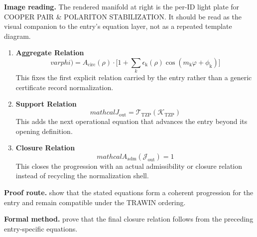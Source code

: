 \begin{samepage}
\noindent\begin{minipage}[t]{0.45\linewidth}
\vspace{0pt}
\raggedright
\scriptsize\textbf{Image reading.} The rendered manifold at right is the per-ID light plate for COOPER PAIR \& POLARITON STABILIZATION. It should be read as the visual companion to the entry's equation layer, not as a repeated template diagram.\par
\end{minipage}\hfill
\begin{minipage}[t]{0.53\linewidth}
\vspace*{-0.10in}
\raggedright
{}
\end{minipage}
\end{samepage}

\clearpage


\begin{enumerate}[leftmargin=1.6em,itemsep=9pt,topsep=6pt]
\item \textbf{Aggregate Relation}
\[
varphi) = A_{\text{circ}}(\rho) \cdot \Big[1 + \sum_{k} \epsilon_{\mathrm{k}}(\rho)\cos(m_{\mathrm{k}}\varphi + \phi_{\mathrm{k}})\Big]
\]
This fixes the first explicit relation carried by the entry rather than a generic certificate record normalization.

\item \textbf{Support Relation}
\[
mathcal{J}_{\mathrm{out}} = \mathcal{T}_{\mathrm{TZP}}\!\left(\mathcal{K}_{\mathrm{TZP}}\right)
\]
This adds the next operational equation that advances the entry beyond its opening definition.

\item \textbf{Closure Relation}
\[
mathcal{A}_{\mathrm{adm}}\!\left(\mathcal{J}_{\mathrm{out}}\right)=1
\]
This closes the progression with an actual admissibility or closure relation instead of recycling the normalization shell.
\end{enumerate}

\textbf{Proof route.} show that the stated equations form a coherent progression for the entry and remain compatible under the TRAWIN ordering.

\textbf{Formal method.} prove that the final closure relation follows from the preceding entry-specific equations.

